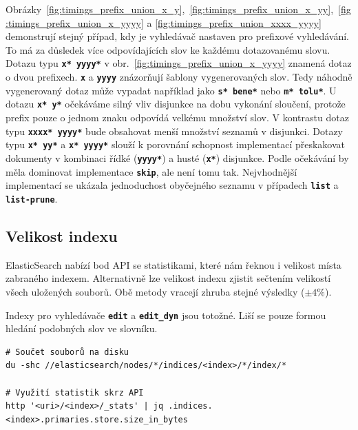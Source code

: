 \documentclass[11pt,letterpaper,oneside,openright]{book}
\newcommand{\bftt}[1]{\texttt{\textbf{#1}}}
\begin{document}
Obrázky~\ref{fig:timings_prefix_union_x_y},~\ref{fig:timings_prefix_union_x_yy},~\ref{fig:timings_prefix_union_x_yyyy}
a \ref{fig:timings_prefix_union_xxxx_yyyy} demonstrují stejný případ, kdy je
vyhledávač nastaven pro prefixové vyhledávání. To má za důsledek více
odpovídajících slov ke každému dotazovanému slovu. Dotazu typu \bftt{x* yyyy*}
v obr.~\ref{fig:timings_prefix_union_x_yyyy} znamená dotaz o dvou prefixech.
\bftt{x} a \bftt{yyyy} znázorňují šablony vygenerovaných slov. Tedy náhodně
vygenerovaný dotaz může vypadat například jako \bftt{s* bene*} nebo \bftt{m*
tolu*}. U dotazu \bftt{x* y*} očekáváme silný vliv disjunkce na dobu vykonání
sloučení, protože prefix pouze o jednom znaku odpovídá velkému množství slov. V
kontrastu dotaz typu \bftt{xxxx* yyyy*}  bude obsahovat menší množství seznamů
v disjunkci. Dotazy typu \bftt{x* yy*} a \bftt{x* yyyy*} slouží k porovnání
schopnost implementací přeskakovat dokumenty v kombinaci řídké (\bftt{yyyy*}) a
husté (\bftt{x*}) disjunkce. Podle očekávání by měla dominovat implementace
\bftt{skip}, ale není tomu tak. Nejvhodnější implementací se ukázala
jednoduchost obyčejného seznamu v případech \bftt{list} a \bftt{list-prune}.

\subsection{Velikost indexu}
ElasticSearch nabízí bod API se statistikami, které nám řeknou i velikost místa
zabraného indexem. Alternativně lze velikost indexu zjistit sečtením velikostí
všech uložených souborů. Obě metody vracejí zhruba stejné výsledky ($\pm 4\%$).

Indexy pro vyhledávače \bftt{edit} a \bftt{edit\_dyn} jsou totožné. Liší se
pouze formou hledání podobných slov ve slovníku.

\begin{Verbatim}
# Součet souborů na disku
du -shc //elasticsearch/nodes/*/indices/<index>/*/index/*

# Využití statistik skrz API
http '<uri>/<index>/_stats' | jq .indices.<index>.primaries.store.size_in_bytes
\end{Verbatim}
\end{document}
